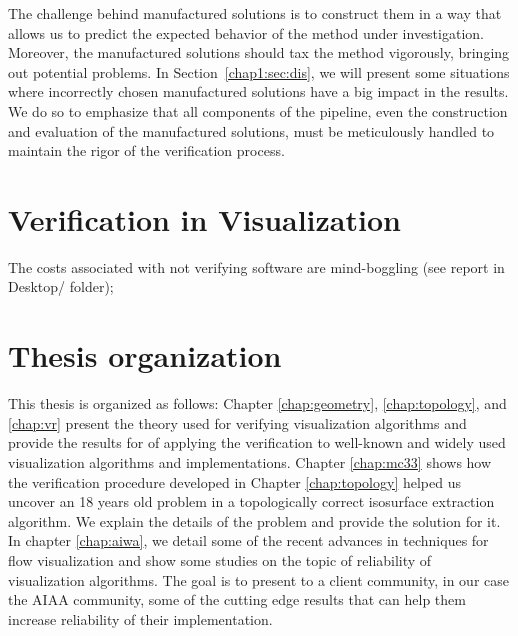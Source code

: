 The challenge behind manufactured solutions is to construct them in a
way that allows us to predict the expected behavior of the method
under investigation.  Moreover, the manufactured solutions should tax
the method vigorously, bringing out potential problems. In
Section~\ref{chap1:sec:dis}, we will present some situations where
incorrectly chosen manufactured solutions have a big impact in the
results.  We do so to emphasize that all components of the pipeline,
even the construction and evaluation of the manufactured solutions,
must be meticulously handled to maintain the rigor of the verification
process.

\section{Verification in Visualization}

%

The costs associated with not verifying software are mind-boggling (see report in Desktop/ folder);


\section{Thesis organization}

This thesis is organized as follows: Chapter \ref{chap:geometry}, \ref{chap:topology}, and \ref{chap:vr} present the theory used for verifying visualization algorithms and provide the results for of applying the verification to well-known and widely used visualization algorithms and implementations. Chapter \ref{chap:mc33} shows how the verification procedure developed in Chapter \ref{chap:topology} helped us uncover an 18 years old problem in a topologically correct isosurface extraction algorithm. We explain the details of the problem and provide the solution for it. In chapter \ref{chap:aiwa}, we detail some of the recent advances in techniques for flow visualization and show some studies on the topic of reliability of visualization algorithms. The goal is to present to a client community, in our case the AIAA community, some of the cutting edge results that can help them increase reliability of their implementation.

